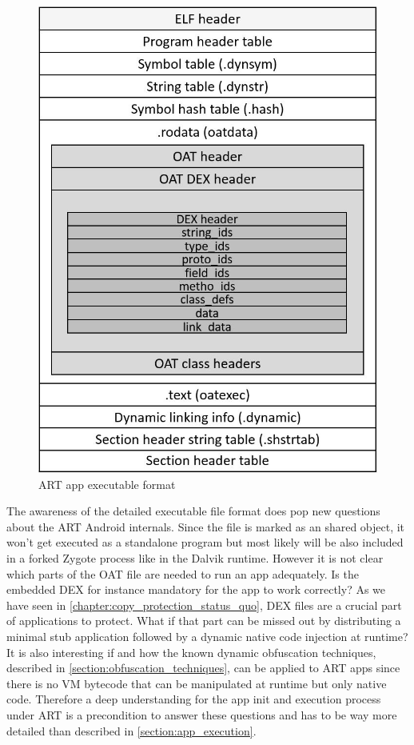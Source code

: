 \begin{figure}[htb]
  \centering
  \includegraphics[scale=0.5]{figures/andelf_format}
  \caption[ART app executable format]{ART app executable format}
  \label{fig:andelf_format}
\end{figure}

The awareness of the detailed executable file format does pop
new questions about the ART Android internals.
Since the file is marked as an shared object, it won't get
executed as a standalone program but most likely will be also
included in a forked Zygote process like in the Dalvik runtime.
However it is not clear which parts of the OAT file are
needed to run an app adequately. Is the embedded DEX for instance
mandatory for the app to work correctly? As we have seen in
\autoref{chapter:copy_protection_status_quo}, DEX files are
a crucial part of applications to protect. What if that part
can be missed out by distributing a minimal stub application
followed by a dynamic native code injection at runtime?
It is also interesting if and how the known dynamic obfuscation
techniques, described in \autoref{section:obfuscation_techniques},
can be applied to ART apps since there is no VM bytecode that can
be manipulated at runtime but only native code.
Therefore a deep understanding for the app init and execution
process under ART is a precondition to answer these
questions and has to be way more detailed than described in
\autoref{section:app_execution}.
